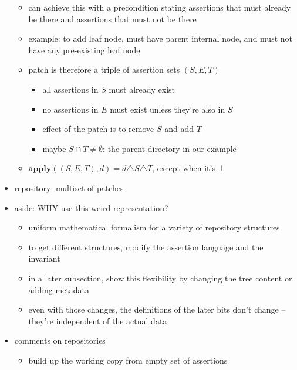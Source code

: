 \documentclass{article}
\newcommand{\undefined}{\ensuremath{\bot}\xspace}
\newcommand{\apply}{\ensuremath{\mathbf{apply}}\xspace}
\begin{document}
\begin{itemize}
        \begin{itemize}
            \item can achieve this with a precondition stating assertions
                that must already be there and assertions that must not be
                there
            \item example: to add leaf node, must have parent internal node,
                and must not have any pre-existing leaf node
            \item patch is therefore a triple of assertion sets $(S,E,T)$
                \begin{itemize}
                    \item all assertions in $S$ must already exist
                    \item no assertions in $E$ must exist unless they're
                        also in $S$
                    \item effect of the patch is to remove $S$ and add $T$
                    \item maybe $S \cap T \ne \emptyset$: the parent
                        directory in our example
                \end{itemize}
            \item $\apply((S,E,T),d)=d \triangle S \triangle T$, except when
                it's \undefined
        \end{itemize}
    \item repository: multiset of patches
    \item aside: WHY use this weird representation?
        \begin{itemize}
            \item uniform mathematical formalism for a variety of repository
                structures
            \item to get different structures, modify the assertion language
                and the invariant
            \item in a later subsection, show this flexibility by changing
                the tree content or adding metadata
            \item even with those changes, the definitions of the later bits
                don't change -- they're independent of the actual data
        \end{itemize}
    \item comments on repositories
        \begin{itemize}
            \item build up the working copy from empty set of assertions

\end{itemize}
\end{itemize}
\end{document}
